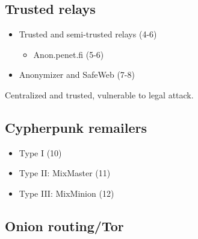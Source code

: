 \documentclass[../overview.tex]{subfiles}
\begin{document}
\subsection{Trusted relays}
\begin{itemize}
	\item Trusted and semi-trusted relays (4-6)
	\begin{itemize}
		\item Anon.penet.fi (5-6)
	\end{itemize}
	\item Anonymizer and SafeWeb (7-8)
\end{itemize}
Centralized and trusted, vulnerable to legal attack.

\subsection{Cypherpunk remailers}
\begin{itemize}
	\item Type I (10)
	\item Type II: MixMaster (11)
	\item Type III: MixMinion (12)
\end{itemize}
\subsection{Onion routing/Tor}
\end{document}
